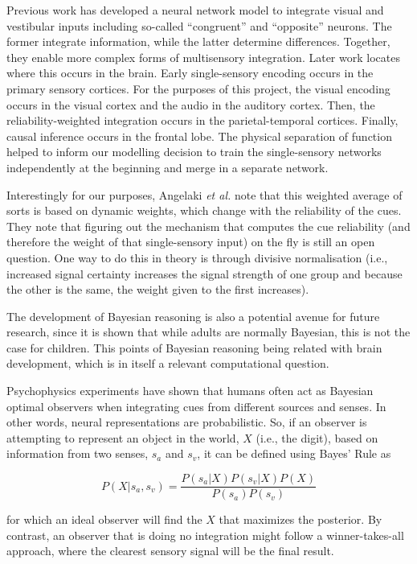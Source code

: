 \documentclass[conference]{IEEEtran}
\begin{document}
Previous work has developed a neural network model to integrate visual and vestibular inputs including so-called “congruent” and “opposite” neurons\cite{b5}. The former integrate information, while the latter determine differences. Together, they enable more complex forms of multisensory integration. Later work locates where this occurs in the brain\cite{b6}. Early single-sensory encoding occurs in the primary sensory cortices. For the purposes of this project, the visual encoding occurs in the visual cortex and the audio in the auditory cortex. Then, the reliability-weighted integration occurs in the parietal-temporal cortices. Finally, causal inference occurs in the frontal lobe. The physical separation of function helped to inform our modelling decision to train the single-sensory networks independently at the beginning and merge in a separate network.

Interestingly for our purposes, Angelaki \textit{et al.}\cite{b2} note that this weighted average of sorts is based on dynamic weights, which change with the reliability of the cues. They note that figuring out the mechanism that computes the cue reliability (and therefore the weight of that single-sensory input) on the fly is still an open question. One way to do this in theory is through divisive normalisation (i.e., increased signal certainty increases the signal strength of one group and because the other is the same, the weight given to the first increases).

The development of Bayesian reasoning is also a potential avenue for future research, since it is shown that while adults are normally Bayesian, this is not the case for children. This points of Bayesian reasoning being related with brain development, which is in itself a relevant computational question.

Psychophysics experiments have shown that humans often act as Bayesian optimal observers when integrating cues from different sources and senses\cite{b1}. In other words, neural representations are probabilistic. So, if an observer is attempting to represent an object in the world, $X$ (i.e., the digit), based on information from two senses, $s_a$ and $s_v$, it can be defined using Bayes’ Rule as

\begin{equation}
    P(X|s_a,s_v) = \frac{P(s_a|X) P(s_v|X) P(X)}{P(s_a) P(s_v)}
\end{equation}

for which an ideal observer will find the $X$ that maximizes the posterior. By contrast, an observer that is doing no integration might follow a winner-takes-all approach, where the clearest sensory signal will be the final result.
\end{document}

